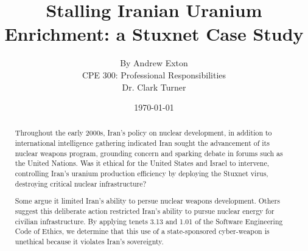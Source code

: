 \documentclass[12pt]{article}
\begin{document}
\title{\vfill Stalling Iranian Uranium Enrichment: a Stuxnet Case Study } %
\author{
By Andrew Exton \vspace{10pt} \\
CPE 300: Professional Responsibilities  \vspace{10pt} \\
Dr. Clark Turner \vspace{10pt} \\
}
\date{\today} %

\maketitle

\vfill  %
\begin{abstract}
Throughout the early 2000s, Iran's policy on nuclear development, in addition to international intelligence gathering indicated Iran sought the advancement of its nuclear weapons program, grounding concern and sparking debate in forums such as the United Nations.\cite{unitedNationsResolutions}
Was it ethical for the United States and Israel to intervene, controlling Iran's uranium production efficiency by deploying the Stuxnet virus, destroying critical nuclear infrastructure?

Some argue it limited Iran's ability to persue nuclear weapons development.\cite{theRealStoryOfStuxnet} Others suggest this deliberate action restricted Iran's ability to pursue nuclear energy for civilian infrastructure.\cite{lookIntoIranianNuclearProgram} By applying tenets 3.13 and 1.01 of the Software Engineering Code of Ethics, we determine that this use of a state-sponsored cyber-weapon is unethical because it violates Iran's sovereignty.


\end{abstract}

\thispagestyle{empty} %
\newpage

\tableofcontents
\newpage
\end{document}
